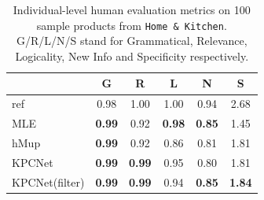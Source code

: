 \documentclass[letterpaper]{article} %
\begin{document}
\begin{table}[bp]
  \small
  \centering
  \begin{tabular}{l|ccccc}
  \hline
  {} & G & R & L & N & S \\
  \hline
  ref  &        0.98 &        1.00 &    1.00 &     0.94 &     2.68 \\
  \hline
  MLE  &        \textbf{0.99} &     0.92 &    \textbf{0.98} &     \textbf{0.85} &     1.45 \\
  hMup &        \textbf{0.99} &     0.92 &    0.86 &     0.81 &     1.81 \\
  KPCNet &        \textbf{0.99} &     \textbf{0.99} &    0.95 &     0.80 &     1.81 \\
  KPCNet(filter) &        \textbf{0.99} &     \textbf{0.99} &    0.94 &     \textbf{0.85} &     \textbf{1.84} \\
  \hline
  \end{tabular}
  \caption{\label{tab:ind-human-eval} Individual-level human evaluation metrics on 100 sample products from \texttt{Home \& Kitchen}. G/R/L/N/S stand for Grammatical, Relevance, Logicality, New Info and Specificity respectively.}
\end{table}
\end{document}
